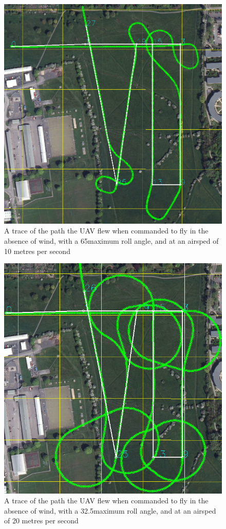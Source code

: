 \begin{figure}[htbp!] 
\centering    
\includegraphics[width=\textwidth]{65_10_NoWind}
\caption{A trace of the path the UAV flew when commanded to fly in the absence of wind, with a 65\degree  maximum roll angle, and at an airsped of 10 metres per second}
\end{figure}

\begin{figure}[htbp!] 
\centering    
\includegraphics[width=\textwidth]{32_20_NoWind}
\caption{A trace of the path the UAV flew when commanded to fly in the absence of wind, with a 32.5\degree  maximum roll angle, and at an airsped of 20 metres per second}
\end{figure}

